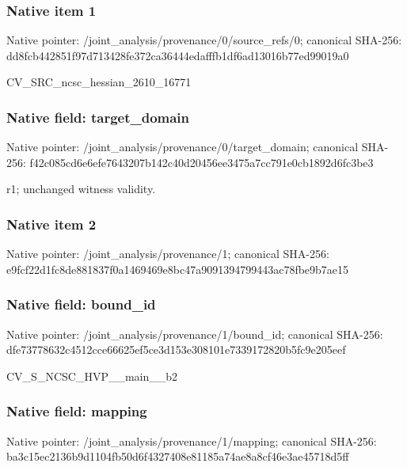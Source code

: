 \documentclass[10pt,a4paper]{article}
\begin{document}
\subsubsection{Native item 1}
Native pointer: /joint\_\allowbreak{}analysis/provenance/0/source\_\allowbreak{}refs/0; canonical SHA-256: dd8fcb442851f97d713428fe372ca36444edafffb1df6ad13016b77ed99019a0

\begingroup\raggedright\sloppy CV\_\allowbreak{}SRC\_\allowbreak{}ncsc\_\allowbreak{}hessian\_\allowbreak{}2610\_\allowbreak{}16771\par\endgroup

\subsubsection{Native field: target\_\allowbreak{}domain}
Native pointer: /joint\_\allowbreak{}analysis/provenance/0/target\_\allowbreak{}domain; canonical SHA-256: f42c085cd6e6efe7643207b142c40d20456ee3475a7cc791e0cb1892d6fc3be3

\begingroup\raggedright\sloppy r1;\allowbreak{} unchanged witness validity.\par\endgroup

\subsubsection{Native item 2}
Native pointer: /joint\_\allowbreak{}analysis/provenance/1; canonical SHA-256: e9fcf22d1fc8de881837f0a1469469e8bc47a9091394799443ac78fbe9b7ae15

\subsubsection{Native field: bound\_\allowbreak{}id}
Native pointer: /joint\_\allowbreak{}analysis/provenance/1/bound\_\allowbreak{}id; canonical SHA-256: dfe73778632c4512cce66625ef5ce3d153e308101e7339172820b5fc9e205eef

\begingroup\raggedright\sloppy CV\_\allowbreak{}S\_\allowbreak{}NCSC\_\allowbreak{}HVP\_\allowbreak{}\_\allowbreak{}main\_\allowbreak{}\_\allowbreak{}b2\par\endgroup

\subsubsection{Native field: mapping}
Native pointer: /joint\_\allowbreak{}analysis/provenance/1/mapping; canonical SHA-256: ba3c15ec2136b9d1104fb50d6f4327408e81185a74ae8a8cf46e3ae45718d5ff
\end{document}
